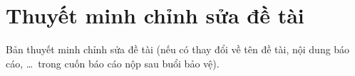 \chapter*{Thuyết minh chỉnh sửa đề tài}
\label{edit}

Bản thuyết minh chỉnh sửa đề tài (nếu có thay đổi về tên đề tài, nội dung báo cáo, \ldots\ trong
cuốn báo cáo nộp sau buổi bảo vệ).
